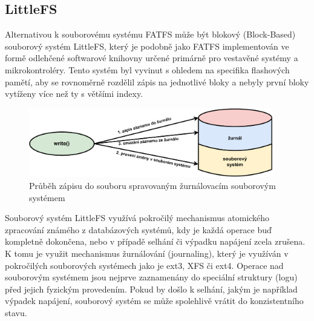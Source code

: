 \subsection{LittleFS}
Alternativou k souborovému systému FATFS může být blokový (Block-Based) souborový systém LittleFS, který je podobně jako FATFS implementován ve formě odlehčené softwarové knihovny určené primárně pro vestavěné systémy a mikrokontroléry.  Tento systém byl vyvinut s ohledem na specifika flashových pamětí, aby se rovnoměrně rozdělil zápis na jednotlivé bloky a nebyly první bloky vytíženy více než ty s většími indexy.

\begin{figure}[h]
    \centering
    \includegraphics[width=0.95\textwidth]{obrazky-figures/journaling-cz.pdf}
    
    \caption{Průběh zápisu do souboru spravovaným žurnálovacím souborovým systémem \cite{architecture_and_design_of_the_linux_storage_stack}}
    \label{fig:journaling}
\end{figure}


Souborový systém LittleFS využívá pokročilý mechanismus atomického zpracování známého z databázových systémů, kdy je každá operace buď kompletně dokončena, nebo v případě selhání či výpadku napájení zcela zrušena. K tomu je využit mechanismus žurnálování (journaling), který je využíván v pokročilých souborových systémech jako je ext3, XFS či ext4. Operace nad souborovým systémem jsou nejprve zaznamenány do speciální struktury (logu) před jejich fyzickým provedením. Pokud by došlo k selhání, jakým je například výpadek napájení, souborový systém se může spolehlivě vrátit do konzistentního stavu.

